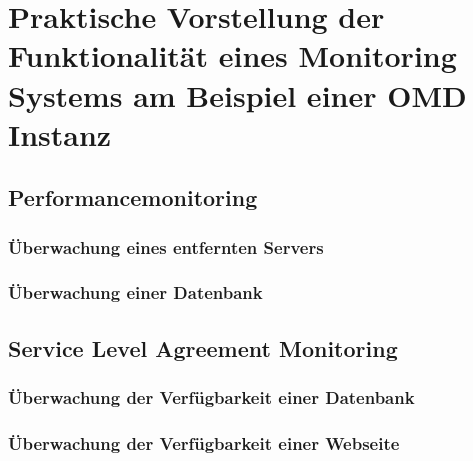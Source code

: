 \documentclass[12pt,a4paper]{report}
\begin{document}
	\chapter{Praktische Vorstellung der Funktionalität eines Monitoring Systems am Beispiel einer OMD Instanz}
	\section{Performancemonitoring}
	\subsection{Überwachung eines entfernten Servers}
	\subsection{Überwachung einer Datenbank}
	\section{Service Level Agreement Monitoring}
	\subsection{Überwachung der Verfügbarkeit einer Datenbank}
	\subsection{Überwachung der Verfügbarkeit einer Webseite}
	\newpage
	\begingroup
	\printbibliography 
	\endgroup
	\printglossaries
	
	
	
\end{document}
